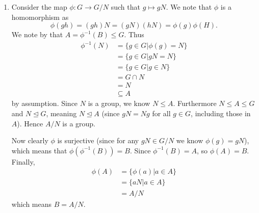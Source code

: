 \begin{enumerate}
    \item Consider the map $\phi: G \to G/N$ such that $g \mapsto gN$. We note that $\phi$ is a homomorphism as
    \[
        \phi(gh) = (gh)N = (gN)(hN) = \phi(g)\phi(H).
    \]
    We note by  that $A = \phi^{-1}(B) \leq G$. Thus
    \begin{align*}
        \phi^{-1}(N) &= \{g \in G \vert \phi(g) = N\}\\
        &= \{g \in G \vert gN = N\}\\
        &= \{g \in G \vert g \in N\}\\
        &= G \cap N\\
        &= N\\
        &\subseteq A
    \end{align*}
    by assumption. Since $N$ is a group, we know $N \leq A$. Furthermore $N \leq A \leq G$ and $N \unlhd G$, meaning $N \unlhd A$ (since $gN = Ng$ for all $g \in G$, including those in $A$). Hence $A/N$ is a group.
    
    Now clearly $\phi$ is surjective (since for any $gN \in G/N$ we know $\phi(g) = gN$), which means that $\phi(\phi^{-1}(B)) = B$. Since $\phi^{-1}(B) = A$, so $\phi(A) = B$. Finally,
    \begin{align*}
        \phi(A) &= \{\phi(a) \vert a \in A\}\\
        &= \{aN \vert a \in A\}\\
        &= A/N
    \end{align*}
    which means $B = A/N$.
\end{enumerate}

